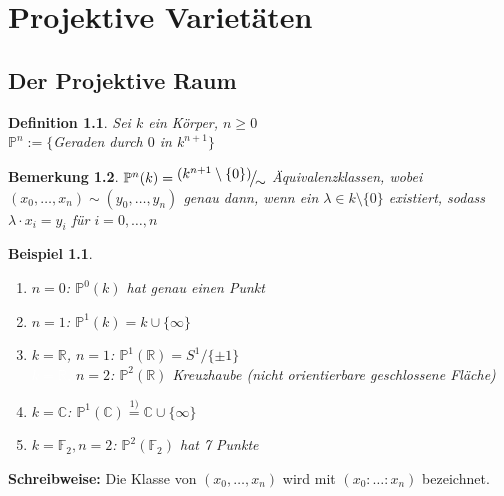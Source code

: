 \documentclass[a4paper,12pt]{report}
\theoremstyle{break}
\newtheorem{Def}{Definition}[section]
\newtheorem{Bem}[Def]{Bemerkung}
\theoremstyle{nonumberbreak}
\newtheorem{nnBsp}{Beispiel}
\theoremstyle{nonumberplain}
\newcommand{\quot}[1]{\textrm{\glqq}{#1}\textrm{\grqq}}
\newcommand{\linetitle}[1]{\textbf{#1}}
\newcommand{\R}{\mathbb{R}}
\newcommand{\C}{\mathbb{C}}
\newcommand{\F}{\mathbb{F}}
\newcommand{\IP}{\mathbb{P}}%
\newcommand{\FakRaum}[2]{
  \raisebox{0.7ex}{\ensuremath{#1}}
  \ensuremath{\mkern-3mu}\big/\ensuremath{\mkern-3mu}
  \raisebox{-0.6ex}{\ensuremath{#2}}}
\begin{document}
\newpage

\chapter{Projektive Variet\"aten}
\setcounter{section}{8}
\section{Der Projektive Raum}

\begin{Def}
Sei $k$ ein K\"orper, $n\geq0$\\
$\IP^n:=\{$Geraden durch $0$ in $k^{n+1}$$\}$
\end{Def}

\begin{Bem}
$\IP^n(k)=\FakRaum{(k^{n+1} \setminus \{0 \})}{\sim}$ \"Aquivalenzklassen, wobei $(x_0,\dots ,x_n) \sim (y_0,\dots ,y_n)$ genau dann, wenn ein $\lambda \in k\setminus \{0\}$ existiert, sodass $\lambda \cdot x_i = y_i$ f\"ur $i=0,\dots ,n$
\end{Bem}

\begin{nnBsp}\begin{enumerate}[1)]
\item[0)]
	$n=0$: $\IP^0(k)$ hat genau einen Punkt

\item
	$n=1$: $\IP^1(k)=k\cup\{\infty\}$

\item
	$k=\R$, $n=1$: $\IP^1(\R)=S^1/\{\pm 1\}$\\
	\textcolor{white}{$k=\R$, }$n=2$: $\IP^2(\R)$ \quot{Kreuzhaube} (nicht orientierbare geschlossene Fl\"ache)

\item
	$k=\C$: $\IP^1(\C) \overset{1)}{=} \C \cup \{\infty\}$

\item
	$k=\F_2, n=2$: $\IP^2(\F_2)$ hat 7 Punkte
\end{enumerate}\end{nnBsp}

\linetitle{Schreibweise:} Die Klasse von $(x_0,\dots ,x_n)$ wird mit $(x_0:\ldots :x_n)$ bezeichnet.
\end{document}
